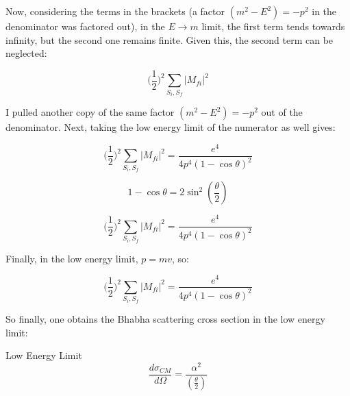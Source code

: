 \documentclass[a4]{article}
\begin{document}
    Now, considering the terms in the brackets (a factor $(m^2 - E^2) = - p^2$ in the denominator was factored out), in the $E \rightarrow m$ limit, the first
    term tends towards infinity, but the second one remains finite. Given this, the second term can be neglected:

    \begin{equation}
        \Big( \frac{1}{2} \Big)^2 \sum_{S_i, S_f} |M_{f i}|^2
    \end{equation}

    I pulled another copy of the same factor $(m^2 - E^2) = - p^2$ out of the denominator. Next, taking the low energy limit of the numerator as well gives:

    \begin{equation}
        \Big( \frac{1}{2} \Big)^2 \sum_{S_i, S_f} |M_{f i}|^2 = \frac{e^4}{4 p^4 (1 - \cos \theta)^2}
    \end{equation}

    \begin{equation}
        1 - \cos \theta = 2 \sin^2 (\frac{\theta}{2})
    \end{equation}

    \begin{equation}
        \Big( \frac{1}{2} \Big)^2 \sum_{S_i, S_f} |M_{f i}|^2 = \frac{e^4}{4 p^4 (1 - \cos \theta)^2}
    \end{equation}

    Finally, in the low energy limit, $p = mv$, so:

    \begin{equation}
        \Big( \frac{1}{2} \Big)^2 \sum_{S_i, S_f} |M_{f i}|^2 = \frac{e^4}{4 p^4 (1 - \cos \theta)^2}
    \end{equation}

    So finally, one obtains the Bhabha scattering cross section in the low energy limit:

    \begin{framed}
        Low Energy Limit
        \begin{equation}
            \frac{d \sigma_{CM}}{d \Omega} = \frac{\alpha^2}{(\frac{\theta}{2})}
        \end{equation}
    \end{framed}
\end{document}
